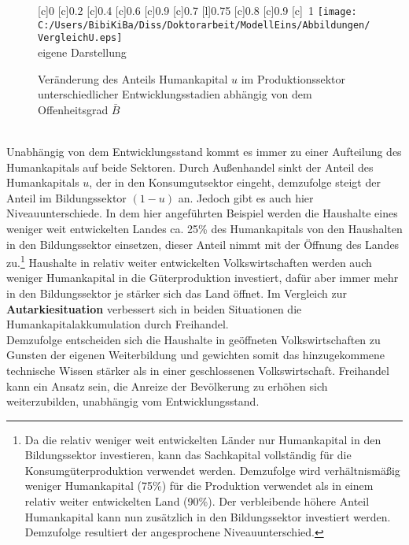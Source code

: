 \begin{figure}[htb] 
\vspace{0.13cm}
 \centering 
		[c]{\footnotesize{0}}
		[c]{\footnotesize{0.2}}
		[c]{\footnotesize{0.4}}
		[c]{\footnotesize{0.6}}
		[c]{\footnotesize{0.9}}
		[c]{\footnotesize{0.7}}
		[l]{\footnotesize{0.75}}
		[c]{\footnotesize{0.8}}
		[c]{\footnotesize{0.9}}
		[c]{~\footnotesize{1}}
\texttt{[image: C:/Users/BibiKiBa/Diss/Doktorarbeit/ModellEins/Abbildungen/VergleichU.eps]}
\\
\hfill\footnotesize{}  eigene Darstellung
	\caption{Veränderung des Anteils Humankapital $u$ im Produktionssektor  unterschiedlicher Entwicklungsstadien abhängig von dem Offenheitsgrad $\bar{B}$}
	\label{fig:VergleichU}
\end{figure}
\\
Unabhängig von dem Entwicklungsstand kommt es immer zu einer Aufteilung des Humankapitals auf beide Sektoren. Durch Au{\ss}enhandel sinkt der Anteil des Humankapitals $u$, der in den Konsumgutsektor eingeht, demzufolge steigt der Anteil im Bildungssektor $(1-u)$ an. Jedoch gibt es auch hier Niveauunterschiede. In dem hier angeführten Beispiel werden die Haushalte eines \textcolor[rgb]{0.74,0.97,0.22}{weniger weit entwickelten Landes} ca. 25\% des Humankapitals von den Haushalten in den Bildungssektor einsetzen, dieser Anteil nimmt mit der Öffnung des Landes zu.\footnote{Da die relativ weniger weit entwickelten Länder nur Humankapital in den Bildungssektor investieren, kann das Sachkapital vollständig für die Konsumgüterproduktion verwendet werden. Demzufolge wird verhältnismä{\ss}ig weniger Humankapital (75\%) für die Produktion verwendet als in einem relativ weiter entwickelten Land (90\%). Der verbleibende höhere Anteil Humankapital kann nun zusätzlich in den Bildungssektor investiert werden. Demzufolge resultiert der angesprochene Niveauunterschied.} Haushalte in \textcolor[rgb]{0,0.58,0}{relativ weiter entwickelten Volkswirtschaften} werden auch weniger Humankapital in die Güterproduktion investiert, dafür aber immer mehr in den Bildungssektor je stärker sich das Land öffnet. Im Vergleich zur \textbf{Autarkiesituation} verbessert sich in beiden Situationen die Humankapitalakkumulation durch Freihandel. \\
Demzufolge entscheiden sich die Haushalte in geöffneten Volkswirtschaften zu Gunsten der eigenen Weiterbildung und gewichten somit das hinzugekommene technische Wissen stärker  als in einer geschlossenen Volkswirtschaft. Freihandel kann ein Ansatz sein, die Anreize der Bevölkerung zu erhöhen sich weiterzubilden, unabhängig vom Entwicklungsstand. \\
